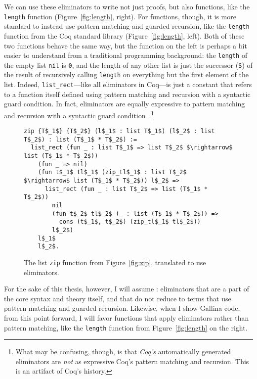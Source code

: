 We can use these eliminators to write not just proofs, but also functions, like the \lstinline{length} function (Figure~\ref{fig:length}, right).
For functions, though, it is more standard to instead use pattern matching and guarded recursion, like 
the \lstinline{length} function from the Coq standard library (Figure~\ref{fig:length}, left).
Both of these two functions behave the same way, but the function on the left is perhaps a bit easier to understand from a traditional programming background:
the \lstinline{length} of the empty list \lstinline{nil} is \lstinline{0}, and the length of any other list
is just the successor (\lstinline{S}) of the result of recursively calling \lstinline{length} on everything but the first element of the list.
Indeed, \lstinline{list_rect}---like all eliminators in Coq---is just a constant that refers to a function itself defined using pattern matching and recursion
with a syntactic guard condition.
In fact, eliminators are equally expressive to pattern matching and recursion with a syntactic guard condition~\cite{recursion-elimination, jesper}.\footnote{What may be confusing, though, is that \textit{Coq's} automatically 
generated eliminators are \textit{not} as expressive Coq's pattern matching and recursion. This is an artifact of Coq's history.}

\begin{figure}
\begin{lstlisting}
zip {T$_1$} {T$_2$} (l$_1$ : list T$_1$) (l$_2$ : list T$_2$) : list (T$_1$ * T$_2$) :=
  list_rect (fun _ : list T$_1$ => list T$_2$ $\rightarrow$ list (T$_1$ * T$_2$))
    (fun _ => nil)
    (fun t$_1$ tl$_1$ (zip_tl$_1$ : list T$_2$ $\rightarrow$ list (T$_1$ * T$_2$)) l$_2$ =>
      list_rect (fun _ : list T$_2$ => list (T$_1$ * T$_2$))
        nil
        (fun t$_2$ tl$_2$ (_ : list (T$_1$ * T$_2$)) =>
          cons (t$_1$, t$_2$) (zip_tl$_1$ tl$_2$))
        l$_2$)
    l$_1$
    l$_2$.
\end{lstlisting}
\caption{The list \lstinline{zip} function from Figure~\ref{fig:zip}, translated to use eliminators.}
\label{fig:zip-elim}
\end{figure}

For the sake of this thesis, however, I will assume : eliminators that are a part of the core syntax and theory itself,
and that do not reduce to terms that use pattern matching and guarded recursion.
Likewise, when I show Gallina code, from this point forward, I will favor functions that apply eliminators rather than pattern matching, like the \lstinline{length} function from Figure~\ref{fig:length}
on the right.

